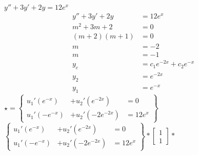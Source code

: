 \begin{ex}
$y''+3y'+2y=12e^x$
\begin{align*}
    y''+3y'+2y&=12e^x\\
    m^2+3m+2&=0\\
    (m+2)(m+1)&=0\\
    m&=-2\\
    m&=-1\\
    y_c&=c_1e^{-2x}+c_2e^{-x}\\
    y_2&=e^{-2x}\\
    y_1&=e^{-x}
\end{align*}
$\star =\left\{
                \begin{array}{rcl}
                  u_1'(e^{-x})&+ u_2'(e^{-2x}) &= 0\\
                  u_1'(-e^{-x}) &+ u_2'(-2e^{-2x}) &=12e^x
                \end{array}
              \right\} $\\
            $\left\{
                \begin{array}{rcl}
                  u_1'(e^{-x})&+ u_2'(e^{-2x}) &= 0\\
                  u_1'(-e^{-x}) &+ u_2'(-2e^{-2x}) &=12e^x
                \end{array}
              \right\} * \left[
                \begin{array}{c}
                  1\\
                  1
                \end{array}
              \right] * $
\end{ex}